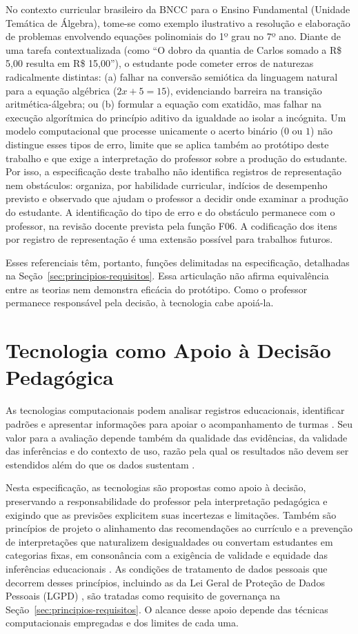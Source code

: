 No contexto curricular brasileiro da BNCC para o Ensino Fundamental (Unidade Temática de Álgebra), tome-se como exemplo ilustrativo a resolução e elaboração de problemas envolvendo equações polinomiais do 1º grau no 7º ano. Diante de uma tarefa contextualizada (como ``O dobro da quantia de Carlos somado a R\$ 5,00 resulta em R\$ 15,00''), o estudante pode cometer erros de naturezas radicalmente distintas: (a) falhar na conversão semiótica da linguagem natural para a equação algébrica ($2x + 5 = 15$), evidenciando barreira na transição aritmética-álgebra; ou (b) formular a equação com exatidão, mas falhar na execução algorítmica do princípio aditivo da igualdade ao isolar a incógnita. Um modelo computacional que processe unicamente o acerto binário ($0$ ou $1$) não distingue esses tipos de erro, limite que se aplica também ao protótipo deste trabalho e que exige a interpretação do professor sobre a produção do estudante. Por isso, a especificação deste trabalho não identifica registros de representação nem obstáculos: organiza, por habilidade curricular, indícios de desempenho previsto e observado que ajudam o professor a decidir onde examinar a produção do estudante. A identificação do tipo de erro e do obstáculo permanece com o professor, na revisão docente prevista pela função F06. A codificação dos itens por registro de representação é uma extensão possível para trabalhos futuros.

Esses referenciais têm, portanto, funções delimitadas na especificação, detalhadas na Seção~\ref{sec:principios-requisitos}. Essa articulação não afirma equivalência entre as teorias nem demonstra eficácia do protótipo. Como o professor permanece responsável pela decisão, à tecnologia cabe apoiá-la.

\section{Tecnologia como Apoio à Decisão Pedagógica}
\label{sec:fund-tecnologia}

As tecnologias computacionais podem analisar registros educacionais, identificar padrões e apresentar informações para apoiar o acompanhamento de turmas \cite{Romero2020}. Seu valor para a avaliação depende também da qualidade das evidências, da validade das inferências e do contexto de uso, razão pela qual os resultados não devem ser estendidos além do que os dados sustentam \cite{NRC2001}.

Nesta especificação, as tecnologias são propostas como apoio à decisão, preservando a responsabilidade do professor pela interpretação pedagógica e exigindo que as previsões explicitem suas incertezas e limitações. Também são princípios de projeto o alinhamento das recomendações ao currículo e a prevenção de interpretações que naturalizem desigualdades ou convertam estudantes em categorias fixas, em consonância com a exigência de validade e equidade das inferências educacionais \cite{NRC2001}. As condições de tratamento de dados pessoais que decorrem desses princípios, incluindo as da Lei Geral de Proteção de Dados Pessoais (LGPD) \cite{LGPD2018}, são tratadas como requisito de governança na Seção~\ref{sec:principios-requisitos}. O alcance desse apoio depende das técnicas computacionais empregadas e dos limites de cada uma.

